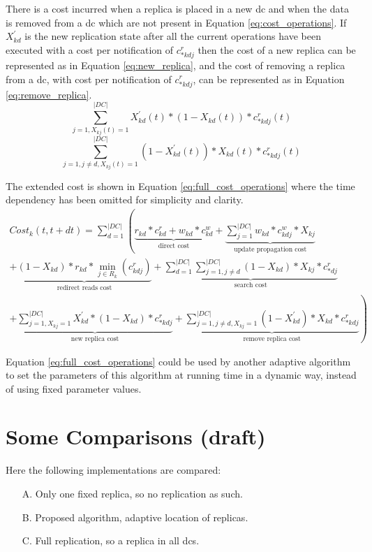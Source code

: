 \documentclass[english]{article}
\begin{document}
There is a cost incurred when a replica is placed in a new \gls{dc} and when the data is removed from a \gls{dc} which are not present in Equation \ref{eq:cost_operations}. If $X^{'}_{kd}$ is the new replication state after all the current operations have been executed with a cost per notification of $c^{r}_{*kdj}$ then the cost of a new replica can be represented as in Equation \ref{eq:new_replica}, and the cost of removing a replica from a \gls{dc}, with cost per notification of $c^{r}_{*kdj}$, can be represented as in Equation \ref{eq:remove_replica}.
\begin{equation} \label{eq:new_replica}
	\sum^{|DC|}_{j = 1, X_{kj}(t) = 1} X^{'}_{kd}(t) * (1 - X_{kd}(t)) * c^{r}_{*kdj}(t)
\end{equation}
\begin{equation} \label{eq:remove_replica}
	\sum^{|DC|}_{j = 1, j \neq d, X_{kj}(t) = 1} (1 - X^{'}_{kd}(t)) * X_{kd}(t) * c^{r}_{*kdj}(t)
\end{equation}

The extended cost is shown in Equation \ref{eq:full_cost_operations} where the time dependency has been omitted for simplicity and clarity.
\begin{equation} \label{eq:full_cost_operations}
	\begin{split}
		Cost_{k}(t, t+dt) = \sum^{|DC|}_{d = 1} \left( \underbrace{r_{kd} * c^{r}_{kd} + w_{kd} * c^{w}_{kd}}_\text{direct cost} + \underbrace{\sum^{|DC|}_{j = 1} w_{kd} * c^{w}_{kdj} * X_{kj}}_\text{update propagation cost} \right. \\ 
		+ \underbrace{(1 - X_{kd}) * r_{kd} * \min_{j \in R_{k}}(c^{r}_{kdj})}_\text{redirect reads cost} + \underbrace{\sum^{|DC|}_{d = 1}  \sum^{|DC|}_{j = 1, j \neq d}  (1 - X_{kd}) * X_{kj} * c^{r}_{*dj}}_\text{search cost} \\
		\left. + \underbrace{\sum^{|DC|}_{j = 1, X_{kj} = 1} X^{'}_{kd} * (1 - X_{kd}) * c^{r}_{*kdj}}_\text{new replica cost} + \underbrace{\sum^{|DC|}_{j = 1, j \neq d, X_{kj} = 1} (1 - X^{'}_{kd}) * X_{kd} * c^{r}_{*kdj}}_\text{remove replica cost} \right)
	\end{split}
\end{equation}

Equation \ref{eq:full_cost_operations} could be used by another adaptive algorithm to set the parameters of this algorithm at running time in a dynamic way, instead of using fixed parameter values.


\section{Some Comparisons (draft)}
Here the following implementations are compared:
\begin{itemize}
	\item[A.] Only one fixed replica, so no replication as such.
	
	\item[B.] Proposed algorithm, adaptive location of replicas.

	\item[C.] Full replication, so a replica in all \glspl{dc}.
\end{itemize}
\end{document}
